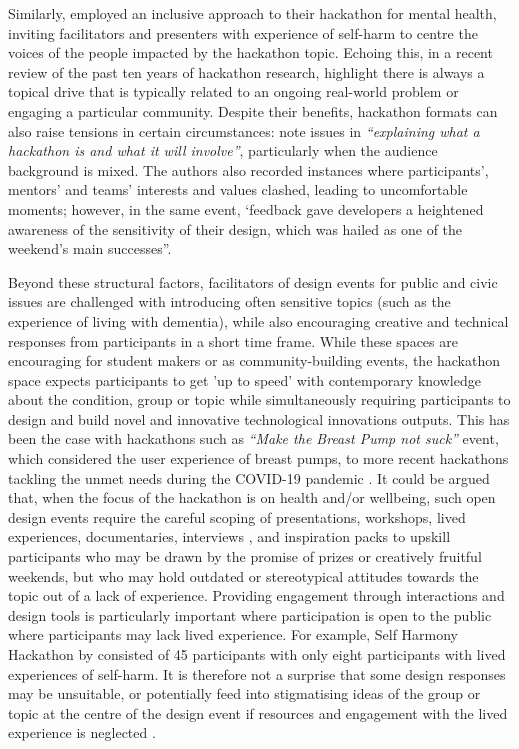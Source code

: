Similarly, \cite{birbeck_self_2017} employed an inclusive approach to their hackathon for mental health, inviting facilitators and presenters with experience of self-harm to centre the voices of the people impacted by the hackathon topic. Echoing this, in a recent review of the past ten years of hackathon research, \cite{falk_olesen_10_2020} highlight there is always a topical drive that is typically related to an ongoing real-world problem or engaging a particular community. Despite their benefits, hackathon formats can also raise tensions in certain circumstances: \cite{taylor_everybodys_2018} note issues in \textit{“explaining what a hackathon is and what it will involve”}, particularly when the audience background is mixed. The authors also recorded instances where participants’, mentors’ and teams’ interests and values clashed, leading to uncomfortable moments; however, in the same event, ‘feedback gave developers a heightened awareness of the sensitivity of their design, which was hailed as one of the weekend’s main successes”. 

Beyond these structural factors, facilitators of design events for public and civic issues are challenged with introducing often sensitive topics (such as the experience of living with dementia), while also encouraging creative and technical responses from participants in a short time frame. While these spaces are encouraging for student makers or as community-building events, the hackathon space expects participants to get 'up to speed’ with contemporary knowledge about the condition, group or topic while simultaneously requiring participants to design and build novel and innovative technological innovations outputs. This has been the case with hackathons such as \textit{“Make the Breast Pump not suck”} \citep{hope_hackathons_2019} event, which considered the user experience of breast pumps, to more recent hackathons tackling the unmet needs during the COVID-19 pandemic \citep{bolton_virtual_2020}. It could be argued that, when the focus of the hackathon is on health and/or wellbeing, such open design events require the careful scoping of presentations, workshops, lived experiences, documentaries, interviews \citep{paganini_engaging_2020}, and inspiration packs \citep{birbeck_self_2017} to upskill participants who may be drawn by the promise of prizes or creatively fruitful weekends, but who may hold outdated or stereotypical attitudes towards the topic out of a lack of experience. Providing engagement through interactions and design tools is particularly important where participation is open to the public where participants may lack lived experience. For example, Self Harmony Hackathon by \cite{birbeck_self_2017} consisted of 45 participants with only eight participants with lived experiences of self-harm.  It is therefore not a surprise that some design responses may be unsuitable, or potentially feed into stigmatising ideas of the group or topic at the centre of the design event if resources and engagement with the lived experience is neglected \citep{toros_co-creation_2020}. 

